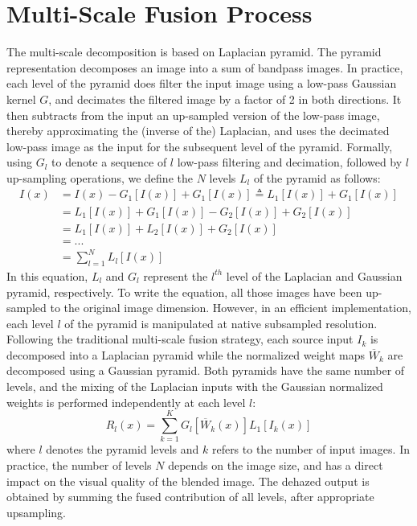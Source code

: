\documentclass[hidelinks, 12pt]{report}
\begin{document}
\section{Multi-Scale Fusion Process}
The multi-scale decomposition is based on Laplacian pyramid. The pyramid representation decomposes an image into a sum of bandpass images. In practice, each level of the pyramid does filter the input image using a low-pass Gaussian kernel $G$, and decimates the filtered image by a factor of 2 in both directions. It then subtracts from the input an up-sampled version of the low-pass image, thereby approximating the (inverse of the) Laplacian, and uses the decimated low-pass image as the input for the subsequent level of the pyramid. Formally, using $G_l$ to denote a sequence of $l$ low-pass filtering and decimation, followed by $l$ up-sampling operations, we define the $N$ levels $L_l$ of the pyramid as follows:
\begin{equation}
\begin{split}
I(x) & = I(x)-G_1[I(x)]+G_1[I(x)] \triangleq L_1[I(x)]+G_1[I(x)]\\
& = L_1[I(x)]+G_1[I(x)]-G_2[I(x)]+G_2[I(x)]\\
& = L_1[I(x)]+L_2[I(x)]+G_2[I(x)]\\
& = ...\\
& = \sum_{l=1}^{N}L_l[I(x)]
\end{split}
\end{equation}
In this equation, $L_l$ and $G_l$ represent the $l^{th}$ level of the Laplacian and Gaussian pyramid, respectively. To write the equation, all those images have been up-sampled to the original image dimension. However, in an efficient implementation, each level $l$ of the pyramid is manipulated at native subsampled resolution. Following the traditional multi-scale fusion strategy, each source input $I_k$ is decomposed into a Laplacian pyramid while the normalized weight maps $\overline{W}_k$ are decomposed using a Gaussian pyramid. Both pyramids have the same number of levels, and the mixing of the Laplacian inputs with the Gaussian normalized weights is performed independently at each level $l$:
\begin{equation}
R_l(x)=\sum_{k=1}^{K}G_l[\overline{W}_k(x)]L_1[I_k(x)]
\end{equation}
where $l$ denotes the pyramid levels and $k$ refers to the number of input images. In practice, the number of levels $N$ depends on the image size, and has a direct impact on the visual quality of the blended image. The dehazed output is obtained by summing the fused contribution of all levels, after appropriate upsampling.
\end{document}
